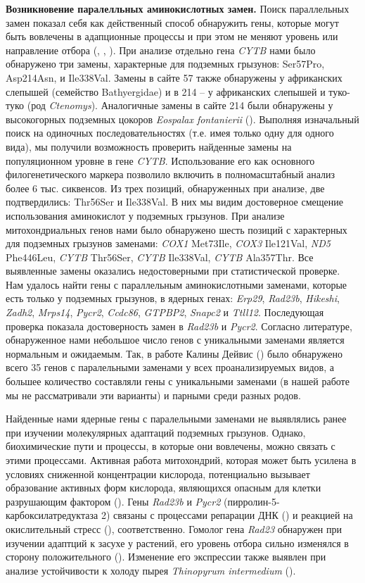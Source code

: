 \textbf{Возникновение паралелльных аминокислотных замен.} Поиск параллельных замен показал себя как действенный способ обнаружить гены, которые могут быть вовлечены в адапционные процессы и при этом не меняют уровень или направление отбора (\cite{Zhou2015}, \cite{Sackman2017}, \cite{Davies2018}). При анализе отдельно гена \textit{CYTB} нами было обнаружено три замены, характерные для подземных грызунов: Ser57Pro, Asp214Asn, и Ile338Val. Замены в сайте 57 также обнаружены у африканских слепышей (семейство Bathyergidae) и в 214 -- у африканских слепышей и туко-туко (род \textit{Ctenomys}). Аналогичные замены в сайте 214 были обнаружены у высокогорных подземных цокоров \textit{Eospalax fontanierii} (\cite{Cooper1993}). Выполняя изначальный поиск на одиночных последовательностях (т.е. имея только одну для одного вида), мы получили возможность проверить найденные замены на популяционном уровне в гене \textit{CYTB}. Использование его как основного филогенетического маркера позволило включить в полномасштабный анализ более 6 тыс. сиквенсов. Из трех позиций, обнаруженных при анализе, две подтвердились: Thr56Ser и Ile338Val. В них мы видим достоверное смещение использования аминокислот у подземных грызунов. При анализе митохондриальных генов нами было обнаружено шесть позиций с характерных для подземных грызунов заменами: \textit{COX1} Met73Ile, \textit{COX3} Ile121Val, \textit{ND5} Phe446Leu, \textit{CYTB} Thr56Ser, \textit{CYTB} Ile338Val, \textit{CYTB} Ala357Thr. Все выявленные замены оказались недостоверными при статистической проверке. Нам удалось найти гены с параллельным аминокислотными заменами, которые есть только у подземных грызунов, в ядерных генах: \textit{Erp29}, \textit{Rad23b}, \textit{Hikeshi}, \textit{Zadh2}, \textit{Mrps14}, \textit{Pycr2}, \textit{Ccdc86}, \textit{GTPBP2}, \textit{Snapc2} и \textit{Ttll12}. Последующая проверка показала достоверность замен в \textit{Rad23b} и \textit{Pycr2}. Согласно литературе, обнаруженное нами небольшое число генов с уникальными заменами  является нормальным и ожидаемым. Так, в работе Калины Дейвис (\cite{Davies2018}) было обнаружено всего 35 генов с паралельными заменами у всех проанализируемых видов, а большее количество составляли гены с уникальными заменами (в нашей работе мы не рассматривали эти варианты) и парными среди разных родов. 

Найденные нами ядерные гены с паралельными заменами не выявлялись ранее при изучении молекулярных адаптаций подземных грызунов. Однако, биохимические пути и процессы, в которые они вовлечены, можно связать с этими процессами. Активная работа митохондрий, которая может быть усилена в условиях сниженной концентрации кислорода, потенциально вызывает образование активных форм кислорода, являющихся опасным для клетки разрушающим фактором (\cite{Turrens2003}). Гены \textit{Rad23b} и \textit{Pycr2} (пирролин-5-карбоксилатредуктаза 2) связаны с процессами репарации ДНК (\cite{Pohjoismaki2012}) и реакцией на окислительный стресс (\cite{Kuo2015}), соответственно. Гомолог гена \textit{Rad23} обнаружен при изучении адаптций к засухе у растений, его уровень отбора сильно изменялся в сторону положительного (\cite{Zhang2013b}). Изменение его экспрессии также выявлен при анализе устойчивости к холоду пырея \textit{Thinopyrum intermedium} (\cite{Jaikumar2020}). 


